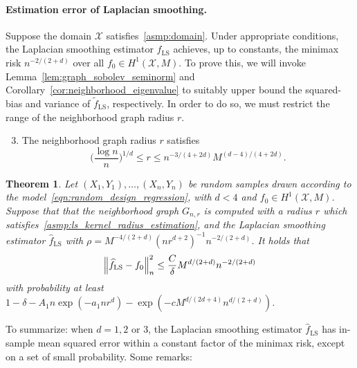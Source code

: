 \documentclass{article}
\newcommand{\1}{\mathbf{1}}
\newcommand{\Xset}{\mathcal{X}}
\newcommand{\wt}[1]{\widetilde{#1}}
\newcommand{\wh}[1]{\widehat{#1}}
\newcommand{\LS}{\mathrm{LS}}
\theoremstyle{alden}
\theoremstyle{aldenthm}
\newtheorem{theorem}{Theorem}
\theoremstyle{definition}
\theoremstyle{remark}
\begin{document}
\paragraph{Estimation error of Laplacian smoothing.} 
Suppose the domain $\Xset$ satisfies~\ref{asmp:domain}. Under appropriate conditions, the Laplacian smoothing estimator $\wh{f}_{\LS}$ achieves, up to constants, the minimax risk $n^{-2/(2 + d)}$ over all $f_0 \in H^1(\Xset,M)$. To prove this, we will invoke Lemma~\ref{lem:graph_sobolev_seminorm} and Corollary~\ref{cor:neighborhood_eigenvalue} to suitably upper bound the squared-bias and variance of $\wt{f}_{\LS}$, respectively. In order to do so, we must restrict the range of the neighborhood graph radius $r$. 
\begin{enumerate}[label=(R\arabic*)]
	\setcounter{enumi}{2}
	\item 
	\label{asmp:ls_kernel_radius_estimation}
	The neighborhood graph radius $r$ satisfies
	\begin{equation*}
	\biggl(\frac{\log n}{n}\biggr)^{1/d} \leq r \leq n^{-3/(4 + 2d)} M^{(d - 4)/(4 + 2d)}.
	\end{equation*}
\end{enumerate}
\begin{theorem}
	\label{thm:laplacian_smoothing_estimation1}
	Let $(X_1,Y_1),\ldots,(X_n,Y_n)$ be random samples drawn according to the model~\eqref{eqn:random_design_regression}, with $d < 4$ and $f_0 \in H^1(\Xset,M)$. Suppose that that the neighborhood graph $G_{n,r}$ is computed with a radius $r$ which satisfies~\ref{asmp:ls_kernel_radius_estimation},  and the Laplacian smoothing estimator $\wh{f}_{\LS}$ with $\rho = M^{-4/(2 + d)} (nr^{d + 2})^{-1} n^{-2/(2 + d)}$. It holds that
	\begin{equation*}
	\Bigl\|\wh{f}_{\LS} - f_0\Bigr\|_n^2 \leq \frac{C}{\delta} M^{d/(2 + d)} n^{-2/(2 + d)}
	\end{equation*}
	with probability at least $1 - \delta -  A_1n\exp(-a_1nr^d) - \exp(-c M^{d/(2d + 4)} n^{d/(2+d)})$.
\end{theorem}
To summarize: when $d = 1,2$ or $3$, the Laplacian smoothing estimator $\wh{f}_{\LS}$ has in-sample mean squared error within a constant factor of the minimax risk, except on a set of small probability. Some remarks:
\end{document}
